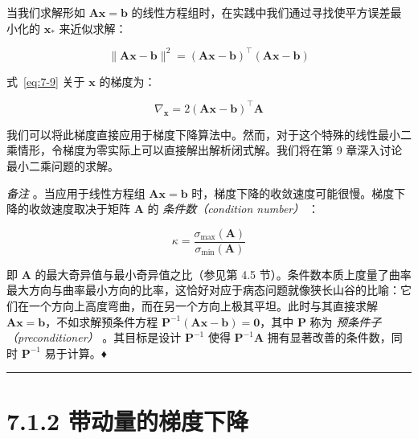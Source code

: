 \begin{notebox}
当我们求解形如 $ \boldsymbol{A} \boldsymbol{x} = \boldsymbol{b} $ 的线性方程组时，在实践中我们通过寻找使平方误差最小化的 $ \boldsymbol{x}_* $ 来近似求解：

\begin{equation}
\|\boldsymbol{A} \boldsymbol{x} - \boldsymbol{b}\|^2 = (\boldsymbol{A} \boldsymbol{x} - \boldsymbol{b})^\top (\boldsymbol{A} \boldsymbol{x} - \boldsymbol{b})
\tag{7.9}\label{eq:7-9}
\end{equation}

式~\eqref{eq:7-9} 关于 $ \boldsymbol{x} $ 的梯度为：

\begin{equation}
\nabla_{\boldsymbol{x}} = 2(\boldsymbol{A} \boldsymbol{x} - \boldsymbol{b})^\top \boldsymbol{A}
\tag{7.10}\label{eq:7-10}
\end{equation}

我们可以将此梯度直接应用于梯度下降算法中。然而，对于这个特殊的线性最小二乘情形，令梯度为零实际上可以直接解出解析闭式解。我们将在第 9 章深入讨论最小二乘问题的求解。
\end{notebox}

\emph{备注} 。当应用于线性方程组 $ \boldsymbol{A} \boldsymbol{x} = \boldsymbol{b} $ 时，梯度下降的收敛速度可能很慢。梯度下降的收敛速度取决于矩阵 $ \boldsymbol{A} $ 的 \emph{条件数（condition number）} ：

\begin{equation*}
\kappa = \frac{\sigma_{\max}(\boldsymbol{A})}{\sigma_{\min}(\boldsymbol{A})}
\end{equation*}

即 $ \boldsymbol{A} $ 的最大奇异值与最小奇异值之比（参见第 4.5 节）。条件数本质上度量了曲率最大方向与曲率最小方向的比率，这恰好对应于病态问题就像狭长山谷的比喻：它们在一个方向上高度弯曲，而在另一个方向上极其平坦。此时与其直接求解 $ \boldsymbol{A} \boldsymbol{x} = \boldsymbol{b} $，不如求解预条件方程 $ \boldsymbol{P}^{-1}(\boldsymbol{A} \boldsymbol{x} - \boldsymbol{b}) = \boldsymbol{0} $，其中 $ \boldsymbol{P} $ 称为 \emph{预条件子（preconditioner）} 。其目标是设计 $ \boldsymbol{P}^{-1} $ 使得 $ \boldsymbol{P}^{-1} \boldsymbol{A} $ 拥有显著改善的条件数，同时 $ \boldsymbol{P}^{-1} $ 易于计算。♦

\medskip\hrule\medskip

\section*{7.1.2 带动量的梯度下降}

